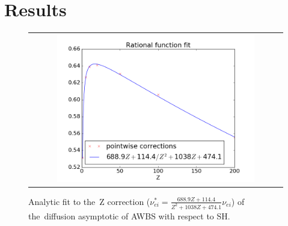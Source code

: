 \documentclass[preprint,12pt]{elsarticle}
\begin{document}
\cite{Dobrev_Kolev_Rieben-High-order_curvilinear_finite_element_methods_for_Lagrangian_hydrodynamics}




\section{Results}\label{sec:results}
\begin{figure}[tbh]
  \begin{center}
    \begin{tabular}{c}
      \includegraphics[width=0.8\textwidth]{../results/fe_analysis/figs/AWBScorrection_fit.png} 
    \end{tabular}
  \caption{
  Analytic fit to the~Z correction 
  ($\nu_{ei}^* = \frac{688.9 Z + 114.4}{Z^2 + 1038 Z + 474.1} \nu_{ei}$) 
  of the~diffusion asymptotic of AWBS with respect to SH.
  }
  \end{center}
  \label{fig:AWBScorrection_f1}
\end{figure}
\end{document}
